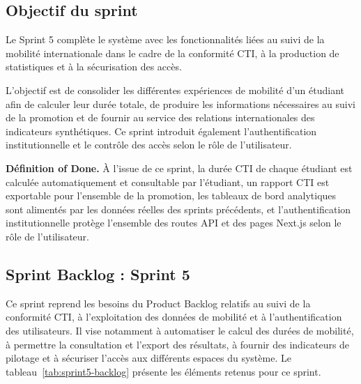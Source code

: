 \subsection{Objectif du sprint}

Le Sprint 5 complète le système avec les fonctionnalités liées au suivi de la mobilité internationale dans le cadre de la conformité CTI, à la production de statistiques et à la sécurisation des accès.

L'objectif est de consolider les différentes expériences de mobilité d'un étudiant afin de calculer leur durée totale, de produire les informations nécessaires au suivi de la promotion et de fournir au service des relations internationales des indicateurs synthétiques. Ce sprint introduit également l'authentification institutionnelle et le contrôle des accès selon le rôle de l'utilisateur.

\textbf{Définition of Done.} À l'issue de ce sprint, la durée CTI de chaque étudiant est calculée automatiquement et consultable par l'étudiant, un rapport CTI est exportable pour l'ensemble de la promotion, les tableaux de bord analytiques sont alimentés par les données réelles des sprints précédents, et l'authentification institutionnelle protège l'ensemble des routes API et des pages Next.js selon le rôle de l'utilisateur.

\setcounter{tasknum}{1}

\newcommand{\usheaderyellow}[2]{%
  \multicolumn{6}{|p{\uswidth}|}{%
    \cellcolor{yellow!15}%
    \textbf{#1} : \small\textit{#2}%
  } \\ \hline
}
\newcommand{\usheadercyan}[2]{%
  \multicolumn{6}{|p{\uswidth}|}{%
    \cellcolor{cyan!10}%
    \textbf{#1} : \small\textit{#2}%
  } \\ \hline
}
\newcommand{\usheaderred}[2]{%
  \multicolumn{6}{|p{\uswidth}|}{%
    \cellcolor{red!8}%
    \textbf{#1} : \small\textit{#2}%
  } \\ \hline
}

\subsection{Sprint Backlog : Sprint 5}

Ce sprint reprend les besoins du Product Backlog relatifs au suivi de la
conformité CTI, à l'exploitation des données de mobilité et à
l'authentification des utilisateurs. Il vise notamment à automatiser le
calcul des durées de mobilité, à permettre la consultation et l'export des
résultats, à fournir des indicateurs de pilotage et à sécuriser l'accès aux
différents espaces du système. Le tableau~\ref{tab:sprint5-backlog} présente
les éléments retenus pour ce sprint.

